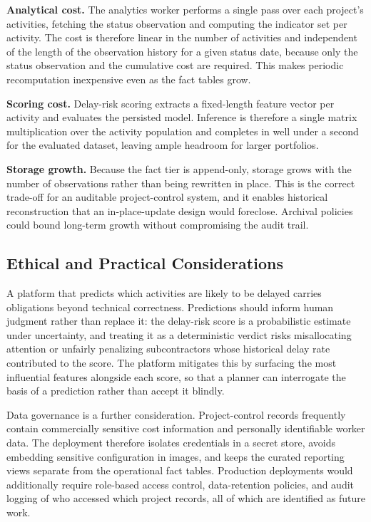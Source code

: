 \documentclass[conference]{IEEEtran}
\begin{document}
\textbf{Analytical cost.} The analytics worker performs a single pass over each project's activities, fetching the status observation and computing the indicator set per activity. The cost is therefore linear in the number of activities and independent of the length of the observation history for a given status date, because only the status observation and the cumulative cost are required. This makes periodic recomputation inexpensive even as the fact tables grow.

\textbf{Scoring cost.} Delay-risk scoring extracts a fixed-length feature vector per activity and evaluates the persisted model. Inference is therefore a single matrix multiplication over the activity population and completes in well under a second for the evaluated dataset, leaving ample headroom for larger portfolios.

\textbf{Storage growth.} Because the fact tier is append-only, storage grows with the number of observations rather than being rewritten in place. This is the correct trade-off for an auditable project-control system, and it enables historical reconstruction that an in-place-update design would foreclose. Archival policies could bound long-term growth without compromising the audit trail.

\subsection{Ethical and Practical Considerations}

A platform that predicts which activities are likely to be delayed carries obligations beyond technical correctness. Predictions should inform human judgment rather than replace it: the delay-risk score is a probabilistic estimate under uncertainty, and treating it as a deterministic verdict risks misallocating attention or unfairly penalizing subcontractors whose historical delay rate contributed to the score. The platform mitigates this by surfacing the most influential features alongside each score, so that a planner can interrogate the basis of a prediction rather than accept it blindly.

Data governance is a further consideration. Project-control records frequently contain commercially sensitive cost information and personally identifiable worker data. The deployment therefore isolates credentials in a secret store, avoids embedding sensitive configuration in images, and keeps the curated reporting views separate from the operational fact tables. Production deployments would additionally require role-based access control, data-retention policies, and audit logging of who accessed which project records, all of which are identified as future work.
\end{document}
